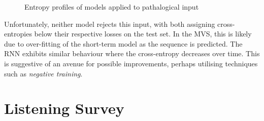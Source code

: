 \documentclass[12pt,a4paper,twoside,openright]{report}
\begin{document}
\begin{figure}[H]
\centering
{}

\caption{Entropy profiles of models applied to pathalogical input}
\label{fig:path-profiles}
\end{figure}

Unfortunately, neither model rejects this input, with both assigning
cross-entropies below their respective losses on the test set. In the MVS, this
is likely due to over-fitting of the short-term model as the sequence is
predicted. The RNN exhibits similar behaviour where the cross-entropy decreases
over time. This is suggestive of an avenue for possible improvements, perhaps
utilising techniques such as \emph{negative training}.

\section{Listening Survey}
\end{document}
